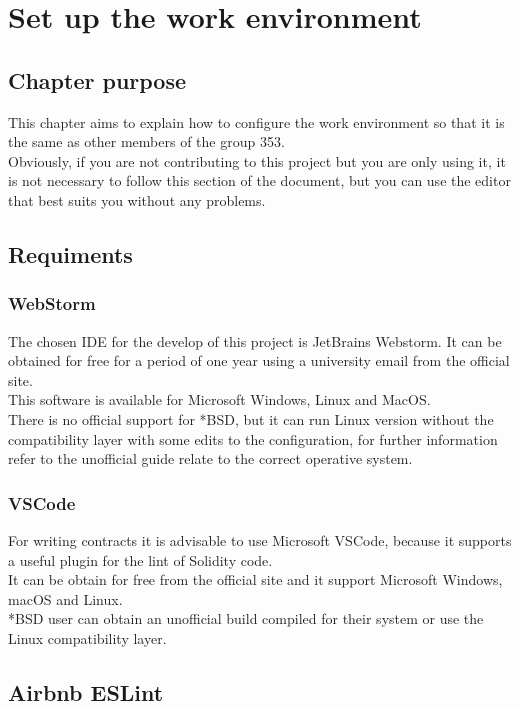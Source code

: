 \documentclass[ManualeSviluppatore.tex]{subfiles}
\begin{document}
\chapter{Set up the work environment}
\section{Chapter purpose}
This chapter aims to explain how to configure the work environment so that it is the same as other members of the group 353. \\
Obviously, if you are not contributing to this project but you are only using it, it is not necessary to follow this section of the document, but you can use the editor that best suits you without any problems.

\section{Requiments}
\subsection{WebStorm}
The chosen IDE for the develop of this project is JetBrains Webstorm. It can be obtained for free for a period of one year using a university email from the official site. \\
This software is available for Microsoft Windows, Linux and MacOS. \\
There is no official support for *BSD, but it can run Linux version without the compatibility layer with some edits to the configuration, for further information refer to the unofficial guide relate to the correct operative system.

\subsection{VSCode}
For writing contracts it is advisable to use Microsoft VSCode, because it supports a useful plugin for the lint of Solidity code. \\
It can be obtain for free from the official site and it support Microsoft Windows, macOS and Linux. \\
*BSD user can obtain an unofficial build compiled for their system or use the Linux compatibility layer. \\
\section{Airbnb ESLint}
\end{document}
